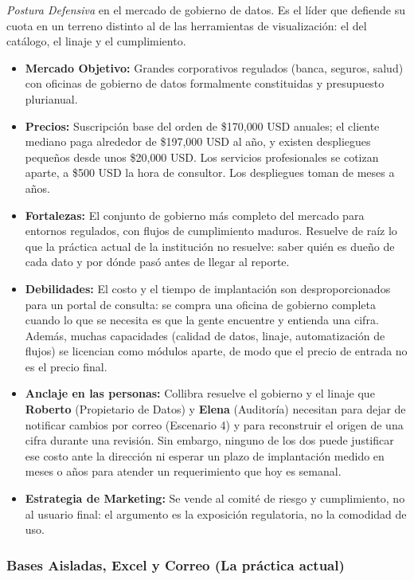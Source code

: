 \textit{Postura Defensiva} en el mercado de gobierno de datos. Es el líder que defiende su cuota en un terreno distinto al de las herramientas de visualización: el del catálogo, el linaje y el cumplimiento.
\begin{itemize}
    \item \textbf{Mercado Objetivo:} Grandes corporativos regulados (banca, seguros, salud) con oficinas de gobierno de datos formalmente constituidas y presupuesto plurianual.
    \item \textbf{Precios:} Suscripción base del orden de \$170{,}000 USD anuales; el cliente mediano paga alrededor de \$197{,}000 USD al año, y existen despliegues pequeños desde unos \$20{,}000 USD. Los servicios profesionales se cotizan aparte, a \$500 USD la hora de consultor. Los despliegues toman de meses a años.
    \item \textbf{Fortalezas:} El conjunto de gobierno más completo del mercado para entornos regulados, con flujos de cumplimiento maduros. Resuelve de raíz lo que la práctica actual de la institución no resuelve: saber quién es dueño de cada dato y por dónde pasó antes de llegar al reporte.
    \item \textbf{Debilidades:} El costo y el tiempo de implantación son desproporcionados para un portal de consulta: se compra una oficina de gobierno completa cuando lo que se necesita es que la gente encuentre y entienda una cifra. Además, muchas capacidades (calidad de datos, linaje, automatización de flujos) se licencian como módulos aparte, de modo que el precio de entrada no es el precio final.
    \item \textbf{Anclaje en las personas:} Collibra resuelve el gobierno y el linaje que \textbf{Roberto} (Propietario de Datos) y \textbf{Elena} (Auditoría) necesitan para dejar de notificar cambios por correo (Escenario 4) y para reconstruir el origen de una cifra durante una revisión. Sin embargo, ninguno de los dos puede justificar ese costo ante la dirección ni esperar un plazo de implantación medido en meses o años para atender un requerimiento que hoy es semanal.
    \item \textbf{Estrategia de Marketing:} Se vende al comité de riesgo y cumplimiento, no al usuario final: el argumento es la exposición regulatoria, no la comodidad de uso.
\end{itemize}

\clearpage
\subsubsection{Bases Aisladas, Excel y Correo (La práctica actual)}


